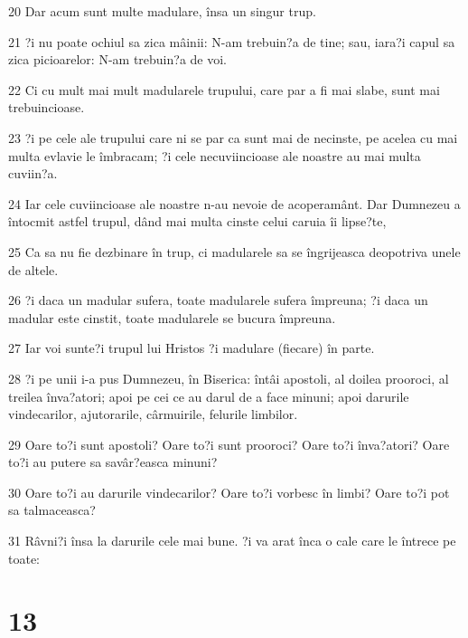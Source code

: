\par 20 Dar acum sunt multe madulare, însa un singur trup.
\par 21 ?i nu poate ochiul sa zica mâinii: N-am trebuin?a de tine; sau, iara?i capul sa zica picioarelor: N-am trebuin?a de voi.
\par 22 Ci cu mult mai mult madularele trupului, care par a fi mai slabe, sunt mai trebuincioase.
\par 23 ?i pe cele ale trupului care ni se par ca sunt mai de necinste, pe acelea cu mai multa evlavie le îmbracam; ?i cele necuviincioase ale noastre au mai multa cuviin?a.
\par 24 Iar cele cuviincioase ale noastre n-au nevoie de acoperamânt. Dar Dumnezeu a întocmit astfel trupul, dând mai multa cinste celui caruia îi lipse?te,
\par 25 Ca sa nu fie dezbinare în trup, ci madularele sa se îngrijeasca deopotriva unele de altele.
\par 26 ?i daca un madular sufera, toate madularele sufera împreuna; ?i daca un madular este cinstit, toate madularele se bucura împreuna.
\par 27 Iar voi sunte?i trupul lui Hristos ?i madulare (fiecare) în parte.
\par 28 ?i pe unii i-a pus Dumnezeu, în Biserica: întâi apostoli, al doilea prooroci, al treilea înva?atori; apoi pe cei ce au darul de a face minuni; apoi darurile vindecarilor, ajutorarile, cârmuirile, felurile limbilor.
\par 29 Oare to?i sunt apostoli? Oare to?i sunt prooroci? Oare to?i înva?atori? Oare to?i au putere sa savâr?easca minuni?
\par 30 Oare to?i au darurile vindecarilor? Oare to?i vorbesc în limbi? Oare to?i pot sa talmaceasca?
\par 31 Râvni?i însa la darurile cele mai bune. ?i va arat înca o cale care le întrece pe toate:

\chapter{13}

